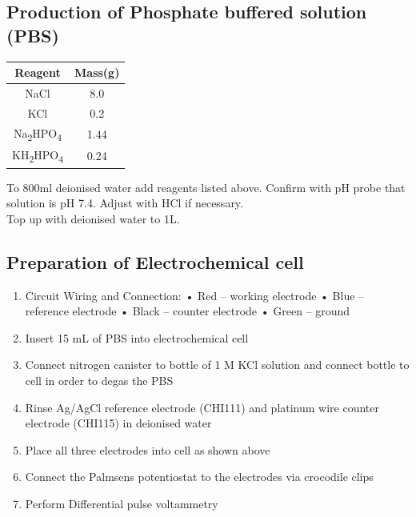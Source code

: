 \begin{appendices}
\subsection{Production of Phosphate buffered solution (PBS)}
\begin{table}[H]
    \centering
    \begin{tabular}{|c|c|}
    \hline
    \textbf{Reagent} & \textbf{Mass(g)}  \\ 
    \hline
    NaCl & 8.0 \\
    KCl & 0.2 \\
    Na\textsubscript{2}HPO\textsubscript{4} & 1.44 \\
    KH\textsubscript{2}HPO\textsubscript{4} & 0.24 \\
    \hline
    \end{tabular}
 
    \label{tab:my_label}
\end{table}

To 800ml deionised water add reagents listed above. 
Confirm with pH probe that solution is pH 7.4. Adjust with HCl if necessary.
\\
Top up with deionised water to 1L.

\subsection{Preparation of Electrochemical cell}
\begin{enumerate}
    \item Circuit Wiring and Connection: • Red – working electrode • Blue – reference electrode • Black – counter electrode • Green – ground
    \item Insert 15 mL of PBS into electrochemical cell
    \item Connect nitrogen canister to bottle of 1 M KCl solution and connect bottle to cell in order to degas the PBS
    \item Rinse Ag/AgCl reference electrode (CHI111) and platinum wire counter\\ electrode (CHI115) in deionised water 
    \item Place all three electrodes into cell as shown above
    \item Connect the Palmsens potentiostat to the electrodes via crocodile clips
    \item Perform Differential pulse voltammetry
\end{enumerate}


\end{appendices}
